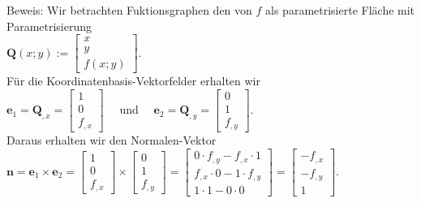 \documentclass[10pt]{article}
\begin{document}
Beweis: Wir betrachten Fuktionsgraphen den von $f$ als parametrisierte Fläche mit Parametrisierung\\
$\mathbf{Q}(x ; y):=\left[\begin{array}{c}x \\ y \\ f(x ; y)\end{array}\right]$.\\
Für die Koordinatenbasis-Vektorfelder erhalten wir\\
$\mathbf{e}_{1}=\mathbf{Q}_{, x}=\left[\begin{array}{c}1 \\ 0 \\ f_{, x}\end{array}\right] \quad$ und $\quad \mathbf{e}_{2}=\mathbf{Q}_{, y}=\left[\begin{array}{c}0 \\ 1 \\ f_{, y}\end{array}\right]$.\\
Daraus erhalten wir den Normalen-Vektor\\
$\mathbf{n}=\mathbf{e}_{1} \times \mathbf{e}_{2}=\left[\begin{array}{c}1 \\ 0 \\ f_{, x}\end{array}\right] \times\left[\begin{array}{c}0 \\ 1 \\ f_{, y}\end{array}\right]=\left[\begin{array}{c}0 \cdot f_{, y}-f_{, x} \cdot 1 \\ f_{, x} \cdot 0-1 \cdot f_{, y} \\ 1 \cdot 1-0 \cdot 0\end{array}\right]=\left[\begin{array}{c}-f_{, x} \\ -f_{, y} \\ 1\end{array}\right]$.
\end{document}
